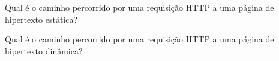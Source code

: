 \begin{exercise}
Qual é o caminho percorrido por uma requisição HTTP a uma página de hipertexto estática?
\end{exercise}

\begin{exercise}
Qual é o caminho percorrido por uma requisição HTTP a uma página de hipertexto dinâmica?
\end{exercise}

